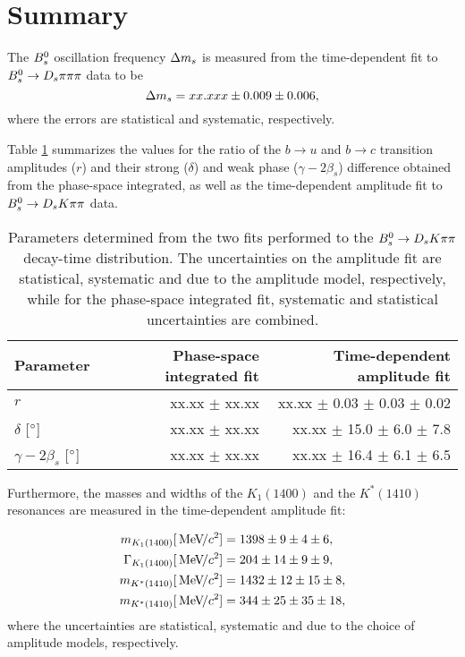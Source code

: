 \section{Summary}
\label{sec:Summary}


The ${{B}^0_{s}}$ oscillation frequency ${\Delta m_{{s}}}$ is measured from the time-dependent fit to ${{B}^0_{s}}\rightarrow{\ensuremath{{D}_{s}}}{\ensuremath{\pi}}{\ensuremath{\pi}}{\ensuremath{\pi}}$ data to be
\begin{equation*}
{\ensuremath{\Delta m_{{s}}}} = xx.xxx \pm 0.009 \pm 0.006,  
\end{equation*}
where the errors are statistical and systematic, respectively.

Table \ref{tab:ResultSummary} summarizes the values for the ratio of the $b\to u$ and $b\to c$ transition amplitudes ($r$)
and their strong ($\delta$) and weak phase ($\gamma -2 \beta_s$) difference 
obtained from the phase-space integrated, as well as the time-dependent amplitude fit to ${{B}^0_{s}}\rightarrow{\ensuremath{{D}_{s}}}{\ensuremath{K}}{\ensuremath{\pi}}{\ensuremath{\pi}}$ data.

\begin{table}[h]
\centering
\caption{Parameters determined from the two fits performed to the ${{B}^0_{s}}\rightarrow{\ensuremath{{D}_{s}}}{\ensuremath{K}}{\ensuremath{\pi}}{\ensuremath{\pi}}$ decay-time distribution. 
The uncertainties on the amplitude fit are statistical, systematic and due to the amplitude model, respectively, while for the phase-space integrated fit, systematic and statistical uncertainties are combined.}
\begin{tabular}{l r r }
\hline
\hline
Parameter & Phase-space integrated fit & Time-dependent amplitude fit \\
\hline
$r$ & xx.xx $\pm$ xx.xx  & xx.xx $\pm$ 0.03 $\pm$ 0.03 $\pm$ 0.02 \\
$\delta$ [$^{\circ}$] & xx.xx $\pm$ xx.xx & xx.xx $\pm$ 15.0 $\pm$ 6.0 $\pm$ 7.8 \\
$\gamma - 2 \beta_s$ [$^{\circ}$] & xx.xx $\pm$ xx.xx  & xx.xx $\pm$ 16.4 $\pm$ 6.1 $\pm$ 6.5 \\
\hline
\hline
\end{tabular}
\label{tab:ResultSummary}
\end{table}

Furthermore, the masses and widths of the $K_{1}(1400)$ and the $K^{*}(1410)$ resonances are measured in the time-dependent amplitude fit:

\begin{align*}
m_{K_{1}(1400)} [{\mathrm{\,Me\kern -0.1em V\!/}c^2}]       & = 1398 \pm 9 \pm 4 \pm 6,   \\
\Gamma_{K_{1}(1400)} [{\mathrm{\,Me\kern -0.1em V\!/}c^2}]  & =  204 \pm 14 \pm 9 \pm 9 ,  \\
 m_{K^{*}(1410)} [{\mathrm{\,Me\kern -0.1em V\!/}c^2}]      & =   1432 \pm 12 \pm 15 \pm 8, \\
 m_{K^{*}(1410)} [{\mathrm{\,Me\kern -0.1em V\!/}c^2}]      & =  344 \pm 25 \pm 35 \pm 18,
\end{align*}
where the uncertainties are statistical, systematic and due to the choice of amplitude models, respectively.
